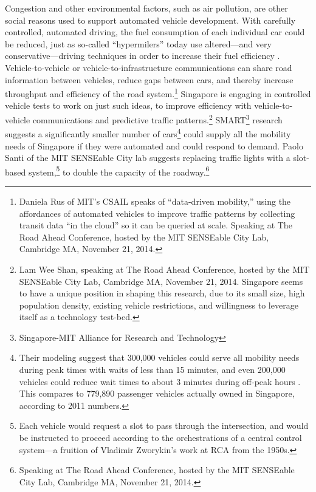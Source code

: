 Congestion and other environmental factors, such as air pollution, are
other social reasons used to support automated vehicle development.
With carefully controlled, automated driving, the fuel consumption of each
individual car could be reduced, just as so-called ``hypermilers''
today use altered---and very conservative---driving techniques in
order to increase their fuel efficiency \cite{orourkeHypermile}.
Vehicle-to-vehicle or vehicle-to-infrastructure communications can
share road information between vehicles, reduce gaps between cars, and
thereby increase throughput and efficiency of the road
system.\footnote{Daniela Rus of MIT's CSAIL speaks of ``data-driven
  mobility,'' using
the affordances of automated vehicles to improve traffic
patterns by collecting transit data ``in the cloud'' so it can be
queried at scale. Speaking at The Road Ahead Conference, hosted by
  the MIT SENSEable City Lab, Cambridge MA, November 21, 2014.} Singapore is engaging in
controlled vehicle tests to work on just such ideas, to improve
efficiency with vehicle-to-vehicle communications and predictive traffic
patterns.\footnote{Lam Wee Shan, speaking at The Road Ahead Conference, hosted by
  the MIT SENSEable City Lab, Cambridge MA, November 21, 2014.
  Singapore seems to have a unique position in shaping this research,
  due to its small size, high population density, existing vehicle
  restrictions, and willingness to 
  leverage itself as a technology test-bed.}
SMART\footnote{Singapore-MIT Alliance for Research and Technology}
research suggests a
significantly smaller number of cars\footnote{Their modeling suggest that 300,000
  vehicles could serve 
all mobility needs during peak times with waits of less than 15
minutes, and even 200,000 vehicles could reduce wait times
to about 3 minutes during off-peak hours \cite{frazzoliSingapore}. This
compares to 779,890 passenger vehicles actually owned in Singapore,
according to 2011 numbers.} could supply all the mobility
needs of Singapore if they were automated and could respond to
demand. Paolo
Santi of the MIT SENSEable City lab suggests replacing traffic lights
with a slot-based system,\footnote{Each vehicle would request a slot to pass through the
intersection, and would be instructed to proceed according to the
orchestrations of a central control system---a fruition of
Vladimir Zworykin's work at RCA from the 1950s.} to double the capacity of the
roadway.\footnote{Speaking at The Road Ahead Conference, hosted by
  the MIT SENSEable City Lab, Cambridge MA, November 21, 2014.} 


